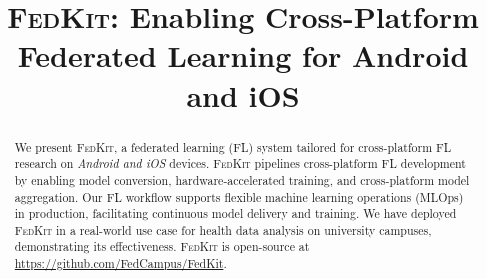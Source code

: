 \documentclass[conference]{IEEEtran}
\begin{document}

\newcommand*\circled[1]{\tikz[baseline=(char.base)]{
        \node[shape=circle,draw,inner sep=.6pt] (char) {#1};}}
\newcommand{\FedCampus}{\textsc{FedCampus}}
\newcommand{\FedKit}{\textsc{FedKit}}
\newcommand{\challa}{\textbf{(C0)}}
\newcommand{\challb}{\textbf{(C1)}}
\newcommand{\challc}{\textbf{(C2)}}

\title
{\FedKit{}: Enabling Cross-Platform Federated Learning for Android and iOS}

\author{
}

\maketitle

\begin{abstract}
We present \FedKit{}, a federated learning (FL) system tailored for
cross-platform FL research on \textit{Android and iOS} devices.
\FedKit{} pipelines cross-platform FL development by
enabling model conversion,
hardware-accelerated training,
and cross-platform model aggregation.
Our FL workflow supports flexible machine learning operations (MLOps) in production,
facilitating continuous model delivery and training.
We have deployed \FedKit{} in a real-world use case for
health data analysis on university campuses,
demonstrating its effectiveness.
\FedKit{} is open-source at \url{https://github.com/FedCampus/FedKit}.
\end{abstract}
\end{document}
